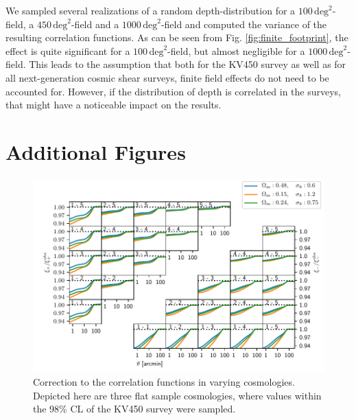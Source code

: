 \documentclass[referee]{aa} %
\renewcommand{\[}{\begin{equation}}
\renewcommand{\]}{\end{equation}}
\renewcommand{\rm}{\mathrm}
\begin{document}
\begin{appendix}
We sampled several realizations of a random depth-distribution for a $100\,\rm{deg}^2$-field, a $450\,\rm{deg}^2$-field and a $1000\,\rm{deg}^2$-field and computed the variance of the resulting correlation functions. As can be seen from Fig. \ref{fig:finite_footprint}, the effect is quite significant for a $100\,\rm{deg}^2$-field, but almost negligible for a $1000\,\rm{deg}^2$-field. This leads to the assumption that both for the KV450 survey as well as for all next-generation cosmic shear surveys, finite field effects do not need to be accounted for. However, if the distribution of depth is correlated in the surveys, that might have a noticeable impact on the results.

\section{Additional Figures}

\begin{figure}[h]
\centering
\includegraphics[width=\textwidth]{images/compare_cosmos.pdf}
\caption{Correction to the correlation functions in varying cosmologies. Depicted here are three flat sample cosmologies, where values within the 98\% CL of the KV450 survey were sampled.}
\label{fig:comparecosmo}
\end{figure}
\end{appendix}
\end{document}

